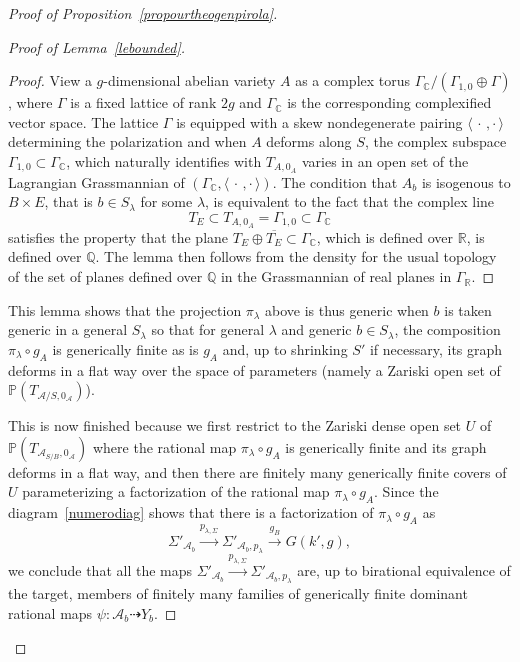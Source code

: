 \begin{proof}[Proof of Proposition~\ref{propourtheogenpirola}]
\begin{proof}[Proof of Lemma~\ref{lebounded}]
\begin{proof}
View a $g$-dimensional abelian variety $A$ as a complex torus $\Gamma_{\mathbb{C}}/(\Gamma_{1,0}\oplus\Gamma)$, where $\Gamma$ is a fixed lattice of rank $2g$ and $\Gamma_{\mathbb{C}}$ is the corresponding complexified vector space. The lattice $\Gamma$ is equipped with a skew nondegenerate pairing $\langle\,\cdot\,,\cdot\,\rangle$ determining the polarization and when $A$ deforms along $S$, the complex subspace $\Gamma_{1,0}\subset \Gamma_{\mathbb{C}}$, which naturally identifies with $T_{A,0_A}$ varies in an open set of the Lagrangian Grassmannian of $(\Gamma_{\mathbb{C}},\langle\,\cdot\,,\cdot\,\rangle)$. The condition that $A_b$ is isogenous to $B\times E$, that is $b\in S_\lambda$ for some $\lambda$, is equivalent to the fact that the complex line
\[
T_{E}\subset T_{A,0_A}=\Gamma_{1,0}\subset \Gamma_{\mathbb{C}}
\]
satisfies the property that the plane $ T_{E}\oplus \overline{ T_{E}}\subset \Gamma_{\mathbb{C}}$, which is defined over $\mathbb{R}$, is defined over $\mathbb{Q}$. The lemma then follows from the density for the usual topology of the set of planes defined over $\mathbb{Q}$ in the Grassmannian of real planes in $ \Gamma_{\mathbb{R}}$.
\end{proof}

This lemma shows that the projection $\pi_\lambda$ above is thus generic when $b$ is taken generic in a general $S_\lambda$ so that for general $\lambda$ and generic $b\in S_\lambda$, the composition $\pi_\lambda\circ g_A$ is generically finite as is $g_A$ and, up to shrinking $S'$ if necessary, its graph deforms in a flat way over the space of parameters (namely a Zariski open set of $\mathbb{P}(T_{\mathcal{A}/S,0_{\mathcal{A}}})$).

This is now finished because we first restrict to the Zariski dense open set $U$ of $\mathbb{P}(T_{\mathcal{A}_{S/B},0_{\mathcal{A}}})$ where the rational map $\pi_\lambda\circ g_A$ is generically finite and its graph deforms in a flat way, and then there are finitely many generically finite covers of $U$ parameterizing a factorization of the rational map $\pi_\lambda\circ g_A$. Since the diagram~\eqref{numerodiag} shows that there is a factorization of $\pi_\lambda\circ g_A$ as
\[
\Sigma'_{\mathcal{A}_b}\stackrel{p_{\lambda,\Sigma}}{\rightarrow }\Sigma'_{\mathcal{A}_b,p_\lambda}\stackrel{g_B}{\rightarrow }G(k',g),
\]
we conclude that all the maps $\Sigma'_{\mathcal{A}_b}\stackrel{p_{\lambda,\Sigma}}{\rightarrow }\Sigma'_{\mathcal{A}_b,p_\lambda}$ are, up to birational equivalence of the target, members of finitely many families of generically finite dominant rational maps $\psi:\mathcal{A}_b\dashrightarrow Y_b$.
\end{proof}


\end{proof}
